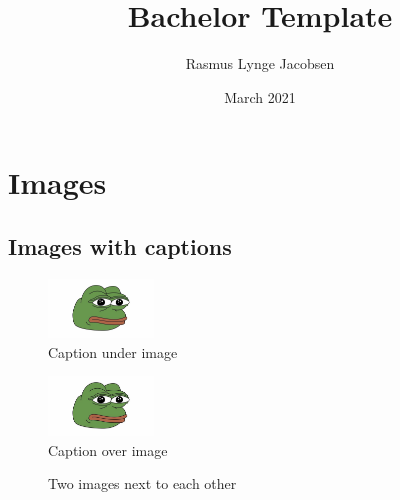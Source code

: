 \documentclass{book}
\title{Bachelor Template}
\author{Rasmus Lynge Jacobsen}
\date{March 2021}
\begin{document}
\maketitle
\begingroup
\let\cleardoublepage\clearpage
\tableofcontents
\endgroup


\chapter{Images}
\section{Images with captions}

\begin{figure}[h]
\centering
\includegraphics[width=0.25\textwidth]{pepe.jpg}
\caption{Caption under image}
\label{fig:pepe1}
\end{figure}

\begin{figure}[h]
\centering
\caption{Caption over image}
\includegraphics[width=0.25\textwidth]{pepe.jpg}
\end{figure}


\begin{figure}%
    \centering
    \qquad
    \caption{Two images next to each other}%
    \label{fig:example}%
\end{figure}
\end{document}
